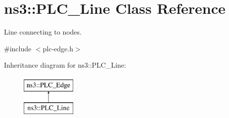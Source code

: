\hypertarget{classns3_1_1PLC__Line}{\section{ns3\-:\-:\-P\-L\-C\-\_\-\-Line \-Class \-Reference}
\label{classns3_1_1PLC__Line}
}


\-Line connecting to nodes.  




{\ttfamily \#include $<$plc-\/edge.\-h$>$}

\-Inheritance diagram for ns3\-:\-:\-P\-L\-C\-\_\-\-Line\-:\begin{figure}[H]
\begin{center}
\leavevmode
\includegraphics[height=2.000000cm]{classns3_1_1PLC__Line}
\end{center}
\end{figure}
